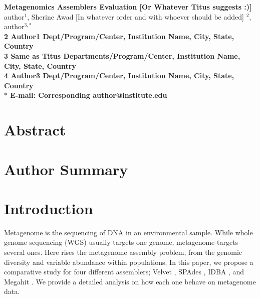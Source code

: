 





\begin{flushleft}
{\Large
\textbf{Metagenomics Assemblers Evaluation [Or Whatever Titus suggests :)] }
}
\\
 
author$^{1}$, 
Sherine Awad [In whatever order and with whoever should be added] $^{2}$, 
author$^{3,\ast}$
\\
\bf{2} Author1  Dept/Program/Center, Institution Name, City, State, Country
\\
\bf{3} Same as Titus Departments/Program/Center, Institution Name, City, State, Country
\\
\bf{4} Author3 Dept/Program/Center, Institution Name, City, State, Country
\\
$\ast$ E-mail: Corresponding author@institute.edu
\end{flushleft}

\section*{Abstract}

\section*{Author Summary}



\section*{Introduction}

Metagenome is the sequencing of DNA in an environmental sample. While whole genome sequencing (WGS) usually targets one genome, metagenome targets several ones. Here rises the metagenome assembly problem, from the genomic diversity and variable abundance within populations. 
In this paper, we propose a comparative study for four different assemblers; Velvet \cite{velvet}, SPAdes \cite {spades}, IDBA \cite{idba}, and Megahit \cite{megahit}.  We provide a detailed analysis on how each one behave on metagenome data. 


